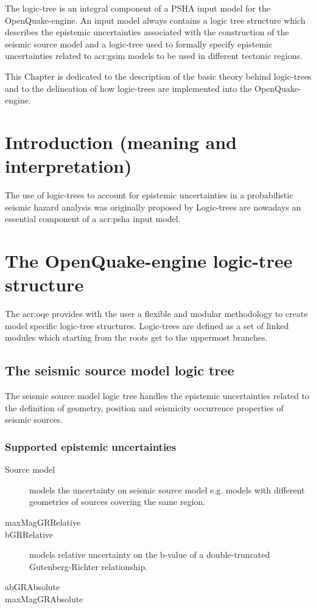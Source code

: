 %
The logic-tree is an integral component of a PSHA input model for the 
OpenQuake-engine. An input model always contains a logic tree structure 
which describes the epistemic uncertainties associated with the construction 
of the seismic source model and a logic-tree used to formally specify 
epistemic uncertainties related to \gls{acr:gsim} models to be used in 
different tectonic regions.

This Chapter is dedicated to the description of the basic theory behind 
logic-trees and to the delineation of how logic-trees are implemented 
into the OpenQuake-engine.
%
\section{Introduction (meaning and interpretation)}
The use of logic-trees to account for epistemic uncertainties in a probabilistic
seismic hazard analysis was originally proposed by 
\cite{kulkarni84}
%
Logic-trees are nowadays an essential component of a \gls{acr:psha} input
model. 
%
\section{The OpenQuake-engine logic-tree structure}
%
The \gls{acr:oqe} provides with the user a flexible and modular methodology 
to create model specific logic-tree structures. Logic-trees are defined as a
set of linked modules which starting from the roots get to the uppermost 
branches.
%
\subsection{The seismic source model logic tree}
The seismic source model logic tree handles the epistemic uncertainties
related to the definition of geometry, position and seismicity occurrence 
properties of seismic sources. 
%
\subsubsection{Supported epistemic uncertainties}

\begin{description}
\item [Source model] models the uncertainty on seismic source model e.g. models
with different geometries of sources covering the same region.
\item [maxMagGRRelative]
\item [bGRRelative] models relative uncertainty on the b-value of a
double-truncated Gutenberg-Richter relationship.
\item [abGRAbsolute]
\item [maxMagGRAbsolute]
\end{description}
%
